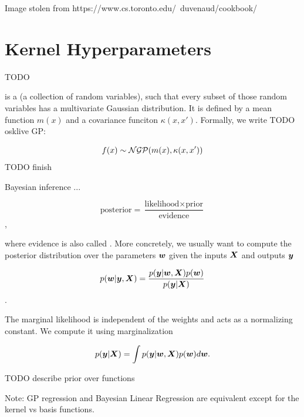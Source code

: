 Image stolen from https://www.cs.toronto.edu/~duvenaud/cookbook/

\section{Kernel Hyperparameters}

TODO


\begin{tcolorbox}
   is a  (a collection
  of random variables), such that every subset of those random variables has
  a multivariate Gaussian distribution. It is defined by a mean function
  $m(x)$ and a covariance funciton $\kappa(x, x')$. Formally, we write {TODO
  osklive GP}:

  \begin{equation}
    f(x) \sim {\mathcal{N}} {\mathcal{G}} {\mathcal{P}} (m(x), \kappa(x, x'))
  \end{equation} {TODO finish}

  Bayesian inference ...

  \begin{equation}
    \text{posterior} = \frac{\text{likelihood} \times \text{prior}}{\text{evidence}}
  \end{equation},

  where evidence is also called . More concretely,
  we usually want to compute the posterior distribution over the parameters
  ${\bm{w}}$ given the inputs ${\bm{X}}$ and outputs ${\bm{y}}$

  \begin{equation}
    p({\bm{w}} | {\bm{y}}, {\bm{X}}) = \frac{p({\bm{y}} | {\bm{w}}, {\bm{X}}) p({\bm{w}})}{p({\bm{y}} | {\bm{X}})}
  \end{equation}.

  The marginal likelihood is independent of the weights and acts as a
  normalizing constant. We compute it using marginalization

  \begin{equation}
    p({\bm{y}} | {\bm{X}}) = \int p({\bm{y}} | {\bm{w}}, {\bm{X}}) p({\bm{w}}) d {\bm{w}}.
  \end{equation}

  {TODO describe prior over functions}
\end{tcolorbox}

Note: GP regression and Bayesian Linear Regression are equivalent except for
the kernel vs basis functions.

